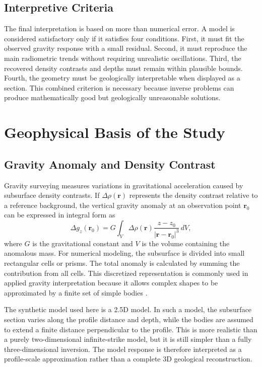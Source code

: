 \documentclass[12pt,a4paper]{article}
\begin{document}
\subsection{Interpretive Criteria}
The final interpretation is based on more than numerical error. A model is considered satisfactory only if it satisfies four conditions. First, it must fit the observed gravity response with a small residual. Second, it must reproduce the main radiometric trends without requiring unrealistic oscillations. Third, the recovered density contrasts and depths must remain within plausible bounds. Fourth, the geometry must be geologically interpretable when displayed as a section. This combined criterion is necessary because inverse problems can produce mathematically good but geologically unreasonable solutions.

\section{Geophysical Basis of the Study}
\subsection{Gravity Anomaly and Density Contrast}
Gravity surveying measures variations in gravitational acceleration caused by subsurface density contrasts. If $\Delta \rho(\mathbf{r})$ represents the density contrast relative to a reference background, the vertical gravity anomaly at an observation point $\mathbf{r}_0$ can be expressed in integral form as
\begin{equation}
    \Delta g_z(\mathbf{r}_0)
    =
    G \int_V
    \Delta \rho(\mathbf{r})
    \frac{z-z_0}{|\mathbf{r}-\mathbf{r}_0|^3}
    \, dV ,
\end{equation}
where $G$ is the gravitational constant and $V$ is the volume containing the anomalous mass. For numerical modeling, the subsurface is divided into small rectangular cells or prisms. The total anomaly is calculated by summing the contribution from all cells. This discretized representation is commonly used in applied gravity interpretation because it allows complex shapes to be approximated by a finite set of simple bodies \cite{telford1990,blakely1995}.

The synthetic model used here is a 2.5D model. In such a model, the subsurface section varies along the profile distance and depth, while the bodies are assumed to extend a finite distance perpendicular to the profile. This is more realistic than a purely two-dimensional infinite-strike model, but it is still simpler than a fully three-dimensional inversion. The model response is therefore interpreted as a profile-scale approximation rather than a complete 3D geological reconstruction.
\end{document}
